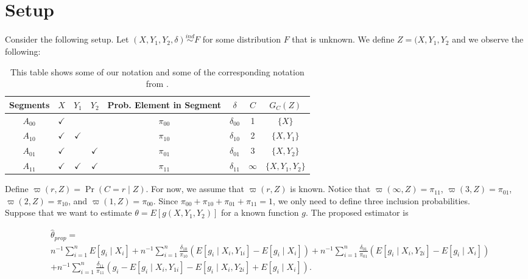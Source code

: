 \documentclass[12pt]{article}
\begin{document}
\rhead{\today}

\section*{Setup}

Consider the following setup. Let $(X, Y_1, Y_2, \delta)  \stackrel{ind}{\sim}
F$ for some distribution $F$ that is unknown. We define $Z = (X, Y_1, Y_2$ and
we observe the following:

\begin{table}[!ht]
  \centering
  \caption{This table shows some of our notation and some of the corresponding
  notation from \cite{tsiatis2006semiparametric}.}
\begin{tabular}{cccccccc}
  \toprule
  Segments & $X$ & $Y_1$ & $Y_2$ & Prob. Element in Segment & $\delta$ & $C$ & $G_C(Z)$ \\
  \midrule
  $A_{00}$ & $\checkmark$ &               &         & $\pi_{00}$ & $\delta_{00}$ & 1 & $\{X\}$ \\
  $A_{10}$ & $\checkmark$ & $\checkmark$  &         & $\pi_{10}$ & $\delta_{10}$ & 2 & $\{X, Y_1\}$ \\
  $A_{01}$ & $\checkmark$ &               & $\checkmark$ & $\pi_{01}$ & $\delta_{01}$ & 3 & $\{X, Y_2\}$ \\
  $A_{11}$ & $\checkmark$ & $\checkmark$  & $\checkmark$ & $\pi_{11}$ & $\delta_{11}$ & $\infty$ & $\{X, Y_1, Y_2\}$ \\
  \bottomrule
\end{tabular}
\end{table}

Define $\varpi(r, Z) = \Pr(C = r \mid Z)$. For now, we assume that $\varpi(r,
Z)$ is known. Notice that $\varpi(\infty, Z) = \pi_11$, $\varpi(3, Z) = \pi_{01}$,
$\varpi(2, Z) = \pi_{10}$, and $\varpi(1, Z) = \pi_{00}$. Since $\pi_{00} +
\pi_{10} + \pi_{01} + \pi_{11} = 1$, we only need to define three inclusion 
probabilities.\\

Suppose that we want to estimate $\theta = E[g(X, Y_1, Y_2)]$ for a known
function $g$. The proposed estimator is 

\begin{align}\label{eq:prop}
  &\hat \theta_{prop} =\\ \nonumber
  &n^{-1} \sum_{i = 1}^n E[g_i \mid X_i] + n^{-1} \sum_{i = 1}^n
  \frac{\delta_{10}}{\pi_{10}} (E[g_i \mid X_i, Y_{1i}] - E[g_i \mid X_i]) 
  + n^{-1} \sum_{i = 1}^n \frac{\delta_{01}}{\pi_{01}} (E[g_i \mid X_i, Y_{2i}] - E[g_i \mid X_i]) \\ \nonumber
  &+ n^{-1} \sum_{i = 1}^n \frac{\delta_{11}}{\pi_{11}} (g_i - E[g_i \mid X_i, Y_{1i}] - E[g_i \mid X_i, Y_{2i}] + E[g_i \mid X_i]).
\end{align}
\end{document}
